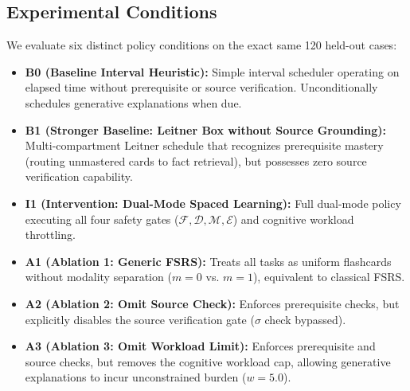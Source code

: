\documentclass[11pt,a4paper]{article}
\begin{document}
\subsection{Experimental Conditions}
We evaluate six distinct policy conditions on the exact same 120 held-out cases:
\begin{itemize}[leftmargin=*]
    \item \textbf{B0 (Baseline Interval Heuristic):} Simple interval scheduler operating on elapsed time without prerequisite or source verification. Unconditionally schedules generative explanations when due.
    \item \textbf{B1 (Stronger Baseline: Leitner Box without Source Grounding):} Multi-compartment Leitner schedule that recognizes prerequisite mastery (routing unmastered cards to fact retrieval), but possesses zero source verification capability.
    \item \textbf{I1 (Intervention: Dual-Mode Spaced Learning):} Full dual-mode policy executing all four safety gates ($\mathcal{F}, \mathcal{D}, \mathcal{M}, \mathcal{E}$) and cognitive workload throttling.
    \item \textbf{A1 (Ablation 1: Generic FSRS):} Treats all tasks as uniform flashcards without modality separation ($m=0$ vs. $m=1$), equivalent to classical FSRS.
    \item \textbf{A2 (Ablation 2: Omit Source Check):} Enforces prerequisite checks, but explicitly disables the source verification gate ($\sigma$ check bypassed).
    \item \textbf{A3 (Ablation 3: Omit Workload Limit):} Enforces prerequisite and source checks, but removes the cognitive workload cap, allowing generative explanations to incur unconstrained burden ($w=5.0$).
\end{itemize}
\end{document}
